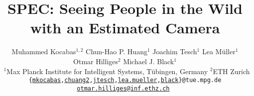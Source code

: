 \documentclass[10pt,twocolumn,letterpaper,usenames,dvipsnames]{article}
\begin{document}
\title{SPEC: Seeing People in the Wild with an Estimated Camera}

\author{Muhammed Kocabas$^{1,2}$\quad \; Chun-Hao P. Huang$^1$\quad \; Joachim Tesch$^1$ \quad \; Lea M\"uller$^1$ \quad \; \\ Otmar Hilliges$^2$\quad \; Michael J. Black$^1$\\\
  \normalsize $^1$Max Planck Institute for Intelligent Systems, T\"{u}bingen, Germany \quad
  \normalsize $^2$ETH Zurich\\
  \normalsize \texttt{\{\href{mailto:mkocabas@tue.mpg.de}{mkocabas},\href{mailto:nathanasiou@tue.mpg.de}{chuang2},\href{mailto:joachim.tesch@tuebingen.mpg.de}{jtesch},\href{mailto:lea.mueller@tuebingen.mpg.de}{lea.mueller},\href{mailto:black@tue.mpg.de}{black}\}@tue.mpg.de} \quad 
  \texttt{\href{mailto:otmar.hilliges@inf.ethz.ch}{otmar.hilliges@inf.ethz.ch} }
}
\newcommand{\mkocabas}[1]{\textcolor{cyan}{[MK: {#1}]}}
\newcommand{\eaksan}[1]{\textcolor{blue}{[EA: {#1}]}}
\newcommand{\phuang}[1]{\textcolor{red}{[PH: {#1}]}}
\newcommand{\otmar}[1]{\textcolor{orange}{[OH: {#1}]}}
\newcommand{\michael}[1]{\textcolor{magenta}{[MJB: {#1}]}}
\newcommand{\lea}[1]{\textcolor{olive}{[LM: {#1}]}}
\newcommand{\oh}[1]{\otmar{#1}}


\newcommand{\predTheta}{\hat{\mathbf{\Theta}}}
\newcommand{\predShape}{\hat{\mathbf{\beta}}}
\newcommand{\predPose}{\hat{\mathbf{\theta}}}
	
\newcommand{\gtTheta}{\mathbf{\Theta}}
\newcommand{\gtShape}{\mathbf{\beta}}
\newcommand{\gtPose}{\mathbf{\theta}}

\newcommand{\motionDisc}{\mathcal{D}_M}	
\newcommand{\generator}{\mathcal{G}}
\newcommand{\smpl}{\mathcal{M}}	

\newcommand{\focalx}{f_x}
\newcommand{\focaly}{f_y}	
\newcommand{\centerx}{o_x}
\newcommand{\centery}{o_y}
\newcommand{\campos}{C}
\newcommand{\camtransl}{t^c}
\newcommand{\camrot}{R^c}
\newcommand{\imgwidth}{w}
\newcommand{\imgheight}{h}
\newcommand{\cropwidth}{w_{bbox}}
\newcommand{\cropheight}{h_{bbox}}
\newcommand{\cropcenterx}{c_x}
\newcommand{\cropcentery}{c_y}
\newcommand{\predjoints}[1]{\hat{\mathcal{J}}_{\mathit{#1D}}}
\newcommand{\gtjoints}[1]{\mathcal{J}_{\mathit{#1D}}}

\newcommand{\bodytransl}{t^b}
\newcommand{\bodyori}{R^b}

\newcommand{\pampjpe}{PA-MPJPE\xspace}
\newcommand{\wmpjpe}{W-MPJPE\xspace}
\newcommand{\cmpjpe}{C-MPJPE\xspace}
\newcommand{\mpjpe}{MPJPE\xspace}
\newcommand{\wpve}{W-PVE\xspace}
\newcommand{\cpve}{C-PVE\xspace}
\newcommand{\pve}{PVE\xspace}
\end{document}
